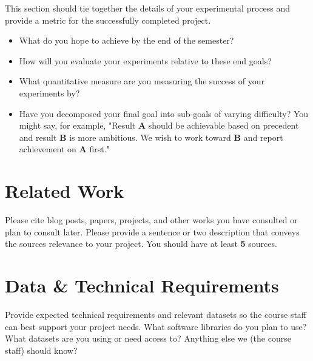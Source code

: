 \documentclass{article}
\begin{document}
This section should tie together the details of your experimental process and provide a metric for the successfully completed project.

\begin{itemize}
\item What do you hope to achieve by the end of the semester?
\item How will you evaluate your experiments relative to these end goals?
\item What quantitative measure are you measuring the success of your experiments by?
\item Have you decomposed your final goal into sub-goals of varying difficulty? You might say, for example, "Result \textbf{A} should be achievable based on precedent and result \textbf{B} is more ambitious. We wish to work toward \textbf{B} and report achievement on \textbf{A} first."
\end{itemize}

\section{Related Work}

Please cite blog posts, papers, projects, and other works you have consulted or plan to consult later. Please provide a sentence or two description that conveys the sources relevance to your project. You should have at least \textbf{5} sources.


\section{Data \& Technical Requirements}

Provide expected technical requirements and relevant datasets so the course staff can best support your project needs. What software libraries do you plan to use? What datasets are you using or need access to? Anything else we (the course staff) should know?

\nocite{Bengio+chapter2007}
\nocite{Hinton06}



\end{document}
